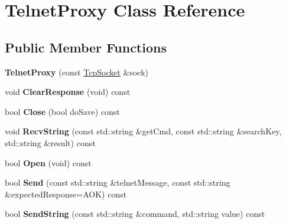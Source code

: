 \hypertarget{class_telnet_proxy}{\section{Telnet\-Proxy Class Reference}
\label{class_telnet_proxy}
}
\subsection*{Public Member Functions}
\begin{DoxyCompactItemize}
\item 
\hypertarget{class_telnet_proxy_aa7f9a2c3dffc0c3b7a2cb6f8e96a4645}{{\bfseries Telnet\-Proxy} (const \hyperlink{class_tcp_socket}{Tcp\-Socket} \&sock)}\label{class_telnet_proxy_aa7f9a2c3dffc0c3b7a2cb6f8e96a4645}

\item 
\hypertarget{class_telnet_proxy_a72cd6c477bcfc9a578ae3357f70ac1e5}{void {\bfseries Clear\-Response} (void) const }\label{class_telnet_proxy_a72cd6c477bcfc9a578ae3357f70ac1e5}

\item 
\hypertarget{class_telnet_proxy_ac06a0c97982e5c948f44eb1cabacf5c8}{bool {\bfseries Close} (bool do\-Save) const }\label{class_telnet_proxy_ac06a0c97982e5c948f44eb1cabacf5c8}

\item 
\hypertarget{class_telnet_proxy_a9f167bcd354e53ab8fb959472415762b}{void {\bfseries Recv\-String} (const std\-::string \&get\-Cmd, const std\-::string \&search\-Key, std\-::string \&result) const }\label{class_telnet_proxy_a9f167bcd354e53ab8fb959472415762b}

\item 
\hypertarget{class_telnet_proxy_a4b7729ca11f4ef533d3015b0a53974e6}{bool {\bfseries Open} (void) const }\label{class_telnet_proxy_a4b7729ca11f4ef533d3015b0a53974e6}

\item 
\hypertarget{class_telnet_proxy_a3a00f8fc67d35112929ca9e664c3197a}{bool {\bfseries Send} (const std\-::string \&telnet\-Message, const std\-::string \&expected\-Response=A\-O\-K) const }\label{class_telnet_proxy_a3a00f8fc67d35112929ca9e664c3197a}

\item 
\hypertarget{class_telnet_proxy_aa9ea9a5af4c1f58f2cc8c6edfa1501ae}{bool {\bfseries Send\-String} (const std\-::string \&command, std\-::string value) const }\label{class_telnet_proxy_aa9ea9a5af4c1f58f2cc8c6edfa1501ae}

\end{DoxyCompactItemize}
